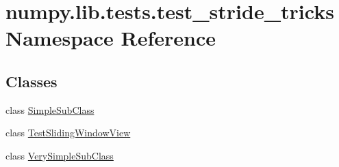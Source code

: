 \hypertarget{namespacenumpy_1_1lib_1_1tests_1_1test__stride__tricks}{}\section{numpy.\+lib.\+tests.\+test\+\_\+stride\+\_\+tricks Namespace Reference}
\label{namespacenumpy_1_1lib_1_1tests_1_1test__stride__tricks}
\subsection*{Classes}
\begin{DoxyCompactItemize}
\item 
class \hyperlink{classnumpy_1_1lib_1_1tests_1_1test__stride__tricks_1_1SimpleSubClass}{Simple\+Sub\+Class}
\item 
class \hyperlink{classnumpy_1_1lib_1_1tests_1_1test__stride__tricks_1_1TestSlidingWindowView}{Test\+Sliding\+Window\+View}
\item 
class \hyperlink{classnumpy_1_1lib_1_1tests_1_1test__stride__tricks_1_1VerySimpleSubClass}{Very\+Simple\+Sub\+Class}
\end{DoxyCompactItemize}
